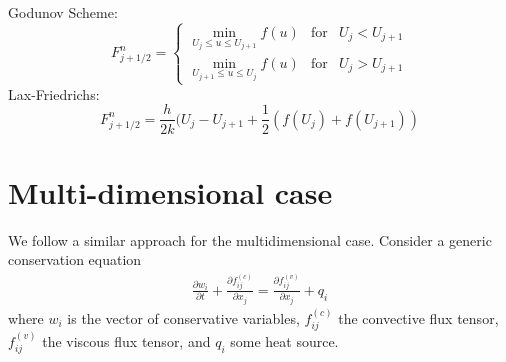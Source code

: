 \documentclass[oneside,a4paper,11pt]{report}
\begin{document}
Godunov Scheme:
$$ F_{j+1/2}^n = \left\{ \begin{array}{lll}  \min_{U_j \le u \le U_{j+1}} f(u) & \text{for} & U_j < U_{j+1}\\
                                                                               \min_{U_{j+1} \le u \le U_j} f(u) & \text{for} & U_j > U_{j+1} \end{array}\right. $$
Lax-Friedrichs:
$$F_{j+1/2}^n = \frac{h}{2k}(U_j-U_{j+1}+\frac{1}{2}(f(U_j)+f(U_{j+1}))$$                                                                               

\section{Multi-dimensional case}
We follow a similar approach for the multidimensional case. Consider a generic conservation equation
\begin{align}
\frac{\partial w_i}{\partial t} + \frac{\partial f^{(c)}_{ij}}{\partial x_j} = \frac{\partial f^{(v)}_{ij}}{\partial x_j} + q_i
\end{align}
where $w_i$ is the vector of conservative variables, $f^{(c)}_{ij}$ the convective flux tensor, $f^{(v)}_{ij}$ the viscous flux tensor, and $q_i$ some heat source. 
\end{document}
